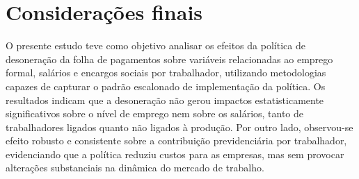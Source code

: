 \documentclass[12pt,a4paper,oneside]{article}
\begin{document}
		
\begin{table}[H]
	\centering
	\caption{Proporção de placebos pós política significativos por variável e metodologia}
	\label{tab:placebo_summary}
\end{table}

		
		\section{Considerações finais}
				
		O presente estudo teve como objetivo analisar os efeitos da política de desoneração da folha de pagamentos sobre variáveis relacionadas ao emprego formal, salários e encargos sociais por trabalhador, utilizando metodologias capazes de capturar o padrão escalonado de implementação da política. Os resultados indicam que a desoneração não gerou impactos estatisticamente significativos sobre o nível de emprego nem sobre os salários, tanto de trabalhadores ligados quanto não ligados à produção. Por outro lado, observou-se efeito robusto e consistente sobre a contribuição previdenciária por trabalhador, evidenciando que a política reduziu custos para as empresas, mas sem provocar alterações substanciais na dinâmica do mercado de trabalho.
		
\end{document}
